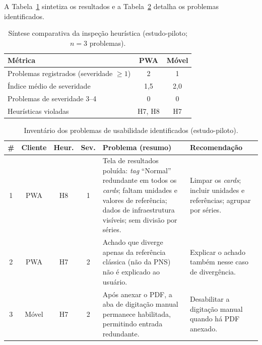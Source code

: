 A Tabela~\ref{tab:usabilidade} sintetiza os resultados e a
Tabela~\ref{tab:inventario_c} detalha os problemas identificados.

\begin{table}[H]
\centering
\caption{Síntese comparativa da inspeção heurística (estudo-piloto; $n=3$ problemas).}
\label{tab:usabilidade}
\footnotesize
\begin{tabular}{|p{6.8cm}|c|c|}
\hline
\textbf{Métrica} & \textbf{PWA} & \textbf{Móvel} \\ \hline
Problemas registrados (severidade $\geq 1$) & 2 & 1 \\ \hline
Índice médio de severidade & 1,5 & 2,0 \\ \hline
Problemas de severidade 3--4 & 0 & 0 \\ \hline
Heurísticas violadas & H7, H8 & H7 \\ \hline
\end{tabular}
\end{table}

\begin{table}[H]
\centering
\caption{Inventário dos problemas de usabilidade identificados (estudo-piloto).}
\label{tab:inventario_c}
\scriptsize
\setlength{\tabcolsep}{3pt}
\begin{tabular}{|c|c|c|c|p{4.9cm}|p{4.0cm}|}
\hline
\textbf{\#} & \textbf{Cliente} & \textbf{Heur.} & \textbf{Sev.} & \textbf{Problema (resumo)} & \textbf{Recomendação} \\ \hline
1 & PWA & H8 & 1 & Tela de resultados poluída: \emph{tag} ``Normal'' redundante em todos os \emph{cards}; faltam unidades e valores de referência; dados de infraestrutura visíveis; sem divisão por séries. & Limpar os \emph{cards}; incluir unidades e referências; agrupar por séries. \\ \hline
2 & PWA & H7 & 2 & Achado que diverge apenas da referência clássica (não da PNS) não é explicado ao usuário. & Explicar o achado também nesse caso de divergência. \\ \hline
3 & Móvel & H7 & 2 & Após anexar o PDF, a aba de digitação manual permanece habilitada, permitindo entrada redundante. & Desabilitar a digitação manual quando há PDF anexado. \\ \hline
\end{tabular}
\end{table}

